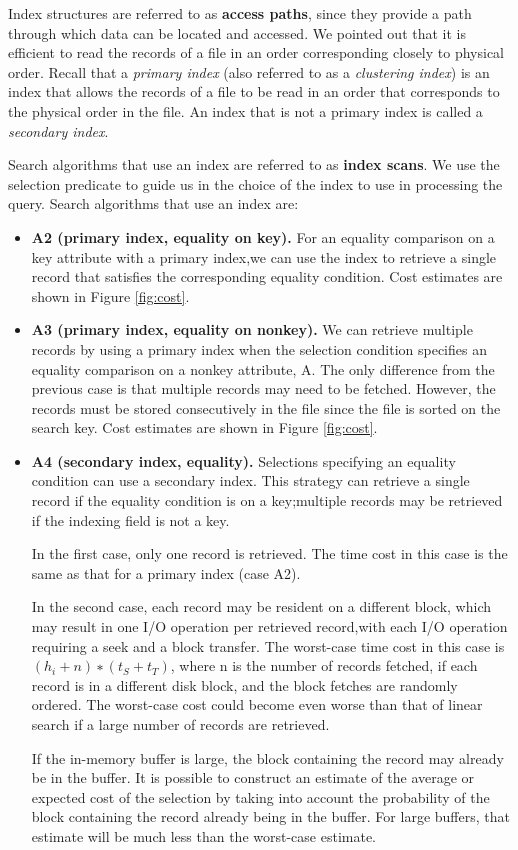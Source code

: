 \documentclass{vldb}
\newcommand{\bi}{\begin{itemize}}
\newcommand{\ei}{\end{itemize}}
\newcommand{\ii}{\item}
\begin{document}
Index structures are referred to as \textbf{access paths}, since they provide a path
through which data can be located and accessed. We pointed out
that it is efficient to read the records of a file in an order corresponding closely to
physical order. Recall that a \textit{primary index} (also referred to as a \textit{clustering index}) is
an index that allows the records of a file to be read in an order that corresponds
to the physical order in the file. An index that is not a primary index is called a
\textit{secondary index}.

Search algorithms that use an index are referred to as \textbf{index scans}. We use the
selection predicate to guide us in the choice of the index to use in processing the
query. Search algorithms that use an index are:

\bi
\ii \textbf{A2 (primary index, equality on key).} For an equality comparison on a key
attribute with a primary index,we can use the index to retrieve a single record
that satisfies the corresponding equality condition. Cost estimates are shown
in Figure \ref{fig:cost}.
\ii \textbf{A3 (primary index, equality on nonkey).} We can retrieve multiple records
by using a primary index when the selection condition specifies an equality
comparison on a nonkey attribute, A. The only difference from the previous
case is that multiple records may need to be fetched. However, the records
must be stored consecutively in the file since the file is sorted on the search
key. Cost estimates are shown in Figure \ref{fig:cost}.
\ii \textbf{A4 (secondary index, equality).} Selections specifying an equality condition
can use a secondary index. This strategy can retrieve a single record if the
equality condition is on a key;multiple records may be retrieved if the indexing
field is not a key.

In the first case, only one record is retrieved. The time cost in this case is
the same as that for a primary index (case A2).

In the second case, each record may be resident on a different block, which
may result in one I/O operation per retrieved record,with each I/O operation
requiring a seek and a block transfer. The worst-case time cost in this case is
$(h_i + n) ∗ (t_S + t_T )$, where n is the number of records fetched, if each record
is in a different disk block, and the block fetches are randomly ordered. The
worst-case cost could become even worse than that of linear search if a large
number of records are retrieved.

If the in-memory buffer is large, the block containing the record may
already be in the buffer. It is possible to construct an estimate of the average
or expected cost of the selection by taking into account the probability of the
block containing the record already being in the buffer. For large buffers, that
estimate will be much less than the worst-case estimate.
\ei
\end{document}

